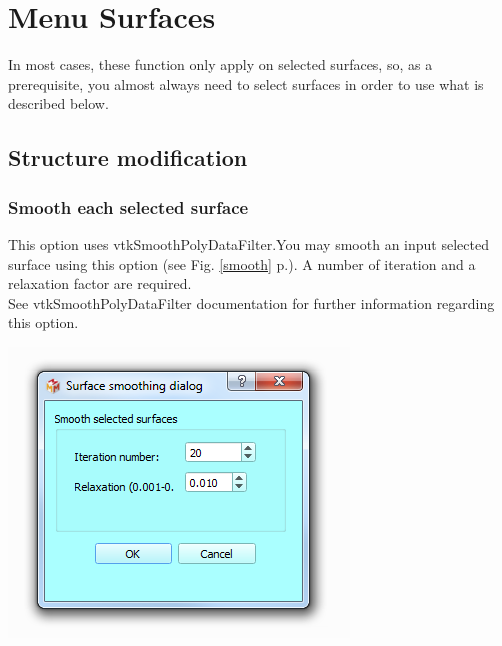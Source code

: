
\chapter{Menu Surfaces}
\minitoc 


In most cases, these function only apply on selected surfaces, so, as a prerequisite, you almost always need to select surfaces in order to use what is described below.



\section{Structure modification}
\subsection{Smooth each selected surface}
\noindent
\begin{minipage}{0.5\textwidth}
This option uses vtkSmoothPolyDataFilter.You may smooth an input
selected surface using this option (see Fig. \ref{smooth} p.\pageref{smooth}). A number of iteration and a
relaxation factor are required.\\
See vtkSmoothPolyDataFilter documentation for further information regarding this option.
\end{minipage}    
\begin{minipage}{0.5\textwidth}\centering
  \includegraphics[scale=0.5]{images/09/structure/surface_smoothing_dialog.png}
 \end{minipage} 
\noindent

